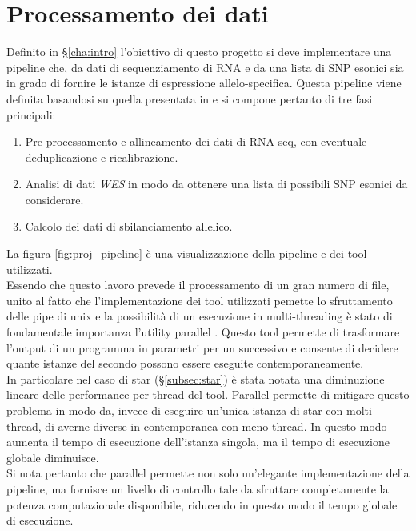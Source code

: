 \graphicspath{{chapters/03/media/}}
\chapter{Processamento dei dati}
\label{cha:processamento}
Definito in \S\ref{cha:intro} l'obiettivo di questo progetto si deve implementare una pipeline che, da dati di sequenziamento di RNA e da una lista di SNP esonici  sia in grado di fornire le istanze di espressione allelo-specifica.
Questa pipeline viene definita basandosi su quella presentata in \cite{ase_pipeline} e si compone pertanto di tre fasi principali:
\begin{enumerate}
	\item Pre-processamento e allineamento dei dati di RNA-seq, con eventuale deduplicazione e ricalibrazione.
	\item Analisi di dati \emph{WES} in modo da ottenere una lista di possibili SNP esonici da considerare.
	\item Calcolo dei dati di sbilanciamento allelico.
\end{enumerate}
La figura \ref{fig:proj_pipeline} \`e una visualizzazione della pipeline e dei tool utilizzati.\\
Essendo che questo lavoro prevede il processamento di un gran numero di file, unito al fatto che l'implementazione dei tool utilizzati pemette lo sfruttamento delle pipe di unix e la possibilit\`a di un esecuzione in multi-threading \`e stato di fondamentale importanza l'utility parallel \cite{parallel}.
Questo tool permette di trasformare l'output di un programma in parametri per un successivo e consente di decidere quante istanze del secondo possono essere eseguite contemporaneamente.\\
In particolare nel caso di star (\S\ref{subsec:star}) \`e stata notata una diminuzione lineare delle performance per thread del tool.
Parallel permette di mitigare questo problema in modo da, invece di eseguire un'unica istanza di star con molti thread, di averne diverse in contemporanea con meno thread.
In questo modo aumenta il tempo di esecuzione dell'istanza singola, ma il tempo di esecuzione globale diminuisce.\\
Si nota pertanto che parallel permette non solo un'elegante implementazione della pipeline, ma fornisce un livello di controllo tale da sfruttare completamente la potenza computazionale disponibile, riducendo in questo modo il tempo globale di esecuzione.

